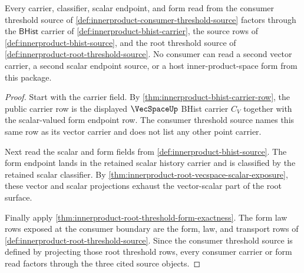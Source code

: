 \begin{theorem}
\label{thm:innerproduct-consumer-carrier-form-scope}
Every carrier, classifier, scalar endpoint, and form read from the consumer
threshold source of \autoref{def:innerproduct-consumer-threshold-source}
factors through the $\mathsf{BHist}$ carrier of
\autoref{def:innerproduct-bhist-carrier}, the source rows of
\autoref{def:innerproduct-bhist-source}, and the root threshold source of
\autoref{def:innerproduct-root-threshold-source}. No consumer can read a
second vector carrier, a second scalar endpoint source, or a host
inner-product-space form from this package.
\end{theorem}
\begin{proof}
Start with the carrier field. By
\autoref{thm:innerproduct-bhist-carrier-row}, the public carrier row is the
displayed $\VecSpaceUp$ BHist carrier $C_V$ together with the scalar-valued
form endpoint row. The consumer threshold source names this same row as its
vector carrier and does not list any other point carrier.

Next read the scalar and form fields from
\autoref{def:innerproduct-bhist-source}. The form endpoint lands in the
retained scalar history carrier and is classified by the retained scalar
classifier. By
\autoref{thm:innerproduct-root-vecspace-scalar-exposure}, these vector and
scalar projections exhaust the vector-scalar part of the root surface.

Finally apply \autoref{thm:innerproduct-root-threshold-form-exactness}. The
form law rows exposed at the consumer boundary are the form, law, and
transport rows of \autoref{def:innerproduct-root-threshold-source}. Since the
consumer threshold source is defined by projecting those root threshold rows,
every consumer carrier or form read factors through the three cited source
objects.
\end{proof}


